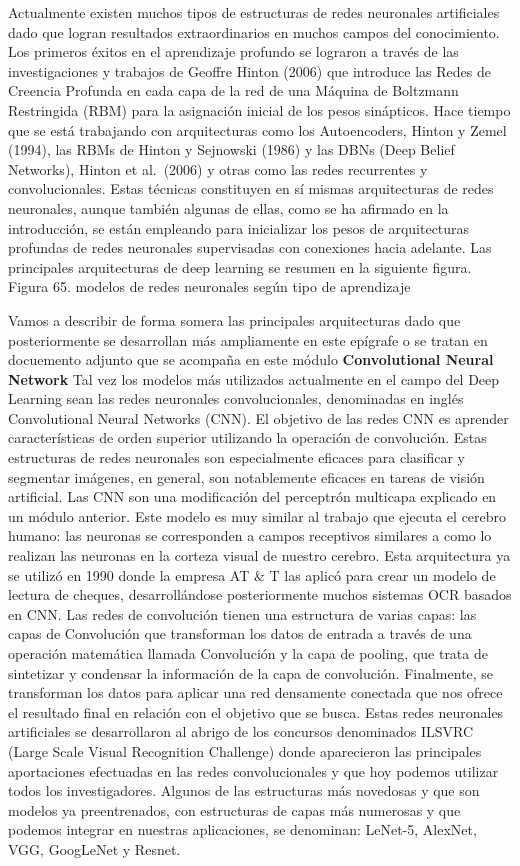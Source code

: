 \documentclass[
  a4paper,
  DIV=11,
  numbers=noendperiod]{scrreprt}
\begin{document}
Actualmente existen muchos tipos de estructuras de redes neuronales
artificiales dado que logran resultados extraordinarios en muchos campos
del conocimiento. Los primeros éxitos en el aprendizaje profundo se
lograron a través de las investigaciones y trabajos de Geoffre Hinton
(2006) que introduce las Redes de Creencia Profunda en cada capa de la
red de una Máquina de Boltzmann Restringida (RBM) para la asignación
inicial de los pesos sinápticos. Hace tiempo que se está trabajando con
arquitecturas como los Autoencoders, Hinton y Zemel (1994), las RBMs de
Hinton y Sejnowski (1986) y las DBNs (Deep Belief Networks), Hinton et
al.~(2006) y otras como las redes recurrentes y convolucionales. Estas
técnicas constituyen en sí mismas arquitecturas de redes neuronales,
aunque también algunas de ellas, como se ha afirmado en la introducción,
se están empleando para inicializar los pesos de arquitecturas profundas
de redes neuronales supervisadas con conexiones hacia adelante. Las
principales arquitecturas de deep learning se resumen en la siguiente
figura. Figura 65. modelos de redes neuronales según tipo de aprendizaje

Vamos a describir de forma somera las principales arquitecturas dado que
posteriormente se desarrollan más ampliamente en este epígrafe o se
tratan en docuemento adjunto que se acompaña en este módulo
\textbf{Convolutional Neural Network} Tal vez los modelos más utilizados
actualmente en el campo del Deep Learning sean las redes neuronales
convolucionales, denominadas en inglés Convolutional Neural Networks
(CNN). El objetivo de las redes CNN es aprender características de orden
superior utilizando la operación de convolución. Estas estructuras de
redes neuronales son especialmente eficaces para clasificar y segmentar
imágenes, en general, son notablemente eficaces en tareas de visión
artificial. Las CNN son una modificación del perceptrón multicapa
explicado en un módulo anterior. Este modelo es muy similar al trabajo
que ejecuta el cerebro humano: las neuronas se corresponden a campos
receptivos similares a como lo realizan las neuronas en la corteza
visual de nuestro cerebro. Esta arquitectura ya se utilizó en 1990 donde
la empresa AT \& T las aplicó para crear un modelo de lectura de
cheques, desarrollándose posteriormente muchos sistemas OCR basados en
CNN. Las redes de convolución tienen una estructura de varias capas: las
capas de Convolución que transforman los datos de entrada a través de
una operación matemática llamada Convolución y la capa de pooling, que
trata de sintetizar y condensar la información de la capa de
convolución. Finalmente, se transforman los datos para aplicar una red
densamente conectada que nos ofrece el resultado final en relación con
el objetivo que se busca. Estas redes neuronales artificiales se
desarrollaron al abrigo de los concursos denominados ILSVRC (Large Scale
Visual Recognition Challenge) donde aparecieron las principales
aportaciones efectuadas en las redes convolucionales y que hoy podemos
utilizar todos los investigadores. Algunos de las estructuras más
novedosas y que son modelos ya preentrenados, con estructuras de capas
más numerosas y que podemos integrar en nuestras aplicaciones, se
denominan: LeNet-5, AlexNet, VGG, GoogLeNet y Resnet.
\end{document}
